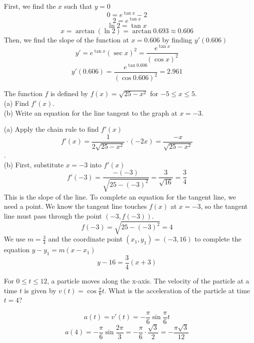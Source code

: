 \begin{Answer}
    [ref=deriv_rules8]
    First, we find the $x$ such that $y = 0$ 
    $$0 = e^{\tan{x}} - 2$$ 
    $$2 = e^{\tan{x}}$$ $$\ln{2} = \tan{x}$$ 
    $$x=\arctan{(\ln{2})} = \arctan{0.693} \approx 0.606$$
    Then, we find the slope of the function at $x=0.606$ by finding 
    $y'(0.606)$ 
    $$y'=e^{\tan{x}}(\sec{x})^2  = \frac{e^{\tan{x}}}{(\cos{x})^2}$$
    $$y'(0.606) = \frac{e^{\tan{0.606}}}{(\cos{0.606})^2} = 2.961$$
\end{Answer}

\begin{Exercise}
    [label=deriv_rules9]
    The function $f$ is defined by $f(x) = \sqrt{25-x^2}$ for $-5 \leq 
    x \leq 5$. \\
    (a) Find $f'(x)$. \\
    (b) Write an equation for the line tangent to the graph at $x = -3$. 
\end{Exercise}
\begin{Answer}
    [ref=deriv_rules9]
    (a) Apply the chain rule to find $f'(x)$ 
    $$f'(x) = \frac{1}{2\sqrt{25 - x^2}} \cdot(-2x) = \frac{-x}{
    \sqrt{25-x^2}}$$. \\
    (b) First, substitute $x=-3$ into $f'(x)$ 
    $$f'(-3) = \frac{-(-3)}{\sqrt{25 - (-3)^2}} = \frac{3}{\sqrt{16}} 
    = \frac{3}{4}$$
    This is the slope of the line. To complete an equation for the 
    tangent line, we need a point. We know the tangent line touches 
    $f(x)$ at $x = -3$, so the tangent line must pass through the 
    point $(-3, f(-3))$. $$f(-3) = \sqrt{25-(-3)^2} = 4$$ We use $m = 
    \frac{3}{4}$ and the coordinate point $(x_1, y_1) = (-3, 16)$ to 
    complete the equation $y - y_1 = m(x - x_1)$ 
    $$y-16 = \frac{3}{4}(x+3)$$
\end{Answer}

\begin{Exercise}
    [label=deriv_rules10]
    For $0 \leq t \leq 12$, a particle moves along the x-axis. The 
    velocity of the particle at a time $t$ is given by $v(t) = 
    \cos{\frac{\pi}{6}t}$. What is the acceleration of the particle 
    at time $t = 4$?
\end{Exercise}
\begin{Answer}
    [ref=deriv_rules10]
    $$a(t) = v'(t) = -\frac{\pi}{6}\sin{\frac{\pi}{6}t}$$
    $$a(4) = -\frac{\pi}{6}\sin{\frac{2\pi}{3}} = 
    -\frac{\pi}{6}\cdot\frac{\sqrt{3}}{2}=-\frac{\pi \sqrt{3}}{12}$$
\end{Answer}

